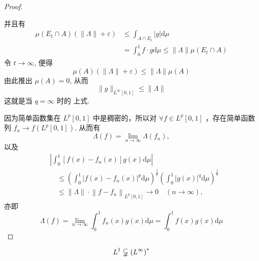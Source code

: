 \documentclass[lang=cn,newtx,10pt,scheme=chinese,thmcnt=chapter]{elegantbook}
\newcommand{\dif}{\mathrm{d}}
\begin{document}
\begin{proof}
\begin{enumerate}
并且有
\begin{equation*}
\begin{aligned}
\mu\left(E_t \cap A\right)(\|\Lambda\|+\varepsilon) & \leqslant \int_{A \cap E_t}|g| \dif \mu \\
& =\int_0^1 f \cdot g\dif \mu \leqslant\|\Lambda\| \mu\left(E_t \cap A\right)
\end{aligned}
\end{equation*}
令 $t \rightarrow \infty$, 便得
\begin{equation*}
\mu(A)(\|\Lambda\|+\varepsilon) \leqslant\|\Lambda\| \mu(A)
\end{equation*}
由此推出 $\mu(A)=0$, 从而
\begin{equation*}
\|g\|_{L^{\infty}[0,1]} \leqslant\|\Lambda\|
\end{equation*}
这就是当 $q=\infty$ 时的 上式.

\end{enumerate}
因为简单函数集在 $L^p[0,1]$ 中是稠密的，所以对 $\forall f \in L^p[0,1]$ ，存在简单函数列 $f_n \rightarrow f\left(L^p[0,1]\right)$. 从而有
\begin{equation*}
\Lambda(f)=\lim _{n \rightarrow \infty} \Lambda\left(f_n\right),
\end{equation*}
以及
\begin{equation*}
\begin{aligned}
& \left|\int_0^1\left[f(x)-f_n(x)\right] g(x) \dif \mu\right| \\
& \quad \leqslant\left(\int_0^1\left|f(x)-f_n(x)\right|^p \dif \mu\right)^{\frac{1}{p}}\left(\int_0^1|g(x)|^q \dif \mu\right)^{\frac{1}{q}} \\
& \quad \leqslant\|\Lambda\| \cdot\left\|f-f_n\right\|_{L^p[0,1]} \rightarrow 0 \quad(n \rightarrow \infty),
\end{aligned}
\end{equation*}
亦即
\begin{equation*}
\Lambda(f)=\lim _{n \rightarrow \infty} \int_0^1 f_n(x) g(x) \dif \mu=\int_0^1 f(x) g(x) \dif \mu
\end{equation*}



\end{proof}
\begin{theorem}


\begin{equation*}
L^1 \varsubsetneqq\left(L^{\infty}\right)^*
\end{equation*}


\end{theorem}
\end{document}
